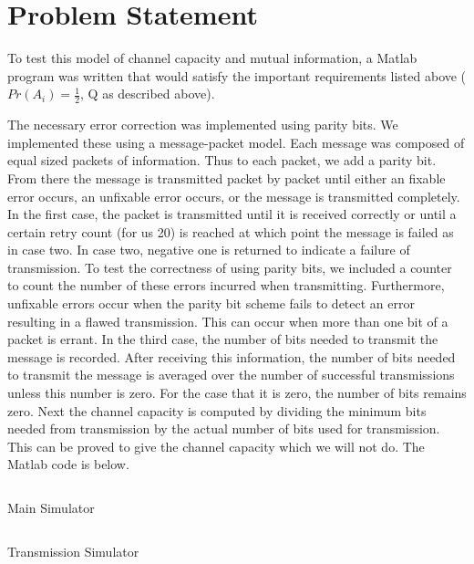 \documentclass{article}
\begin{document}
   \section{Problem Statement}
      To test this model of channel capacity and mutual information,
      a Matlab program was written that would satisfy the important
      requirements listed above ($Pr(A_i) = \frac{1}{2}$, Q as described above).

      The necessary error correction was implemented using parity bits.
      We implemented these using a message-packet model. Each message was
      composed of equal sized packets of information. Thus to each packet,
      we add a parity bit. From there the message is transmitted packet by
      packet until either an fixable error occurs, an unfixable error occurs,
      or the message is transmitted completely. In the first case, the packet
      is transmitted until it is received correctly or until a certain retry
      count (for us 20) is reached at which point the message is failed as
      in case two. In case two, negative one is returned to indicate a failure
      of transmission. To test the correctness
      of using parity bits, we included a counter
      to count the number of these errors incurred when transmitting.
      Furthermore, unfixable errors occur when the parity bit scheme
      fails to detect an error resulting in a flawed transmission. This
      can occur when more than one bit of a packet is errant.
      In the third case, the number of bits needed to transmit the message
      is recorded. After receiving this information, the number of bits
      needed to transmit the message is averaged over the number of successful
      transmissions unless this number is zero. For the case that it is zero,
      the number of bits remains zero. Next the channel capacity is computed
      by dividing the minimum bits needed from transmission by the actual
      number of bits used for transmission. This can be proved to give the
      channel capacity which we will not do. The Matlab code is below.

      \begin{listing}[H]
         \inputminted[linenos]{matlab}{../main.m}
         \caption{Main Simulator}
      \end{listing}
      
      \begin{listing}[H]
         \inputminted[linenos]{matlab}{../transmit.m}
         \caption{Transmission Simulator}
      \end{listing}
\end{document}
